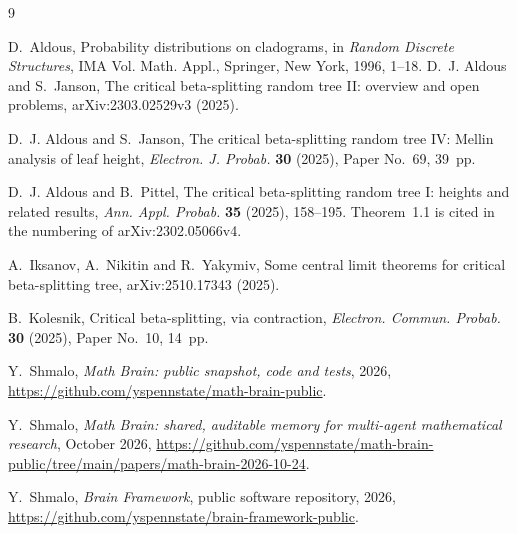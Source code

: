 \documentclass[11pt]{amsart}
\theoremstyle{remark}
\numberwithin{equation}{section}
\begin{document}
\begin{thebibliography}{9}

D.~Aldous, Probability distributions on cladograms, in \emph{Random Discrete Structures}, IMA Vol. Math. Appl., Springer, New York, 1996, 1--18.
D.~J. Aldous and S.~Janson, The critical beta-splitting random tree II: overview and open problems, arXiv:2303.02529v3 (2025).

D.~J. Aldous and S.~Janson, The critical beta-splitting random tree IV: Mellin analysis of leaf height, \emph{Electron. J. Probab.} \textbf{30} (2025), Paper No.~69, 39~pp.

D.~J. Aldous and B.~Pittel, The critical beta-splitting random tree I: heights and related results, \emph{Ann. Appl. Probab.} \textbf{35} (2025), 158--195. Theorem~1.1 is cited in the numbering of arXiv:2302.05066v4.

A.~Iksanov, A.~Nikitin and R.~Yakymiv, Some central limit theorems for critical beta-splitting tree, arXiv:2510.17343 (2025).

B.~Kolesnik, Critical beta-splitting, via contraction, \emph{Electron. Commun. Probab.} \textbf{30} (2025), Paper No.~10, 14~pp.

 Y.~Shmalo, \emph{Math Brain: public snapshot, code and tests}, 2026, \url{https://github.com/yspennstate/math-brain-public}.

 Y.~Shmalo, \emph{Math Brain: shared, auditable memory for multi-agent mathematical research}, October 2026, \url{https://github.com/yspennstate/math-brain-public/tree/main/papers/math-brain-2026-10-24}.

 Y.~Shmalo, \emph{Brain Framework}, public software repository, 2026, \url{https://github.com/yspennstate/brain-framework-public}.

\end{thebibliography}
\end{document}
